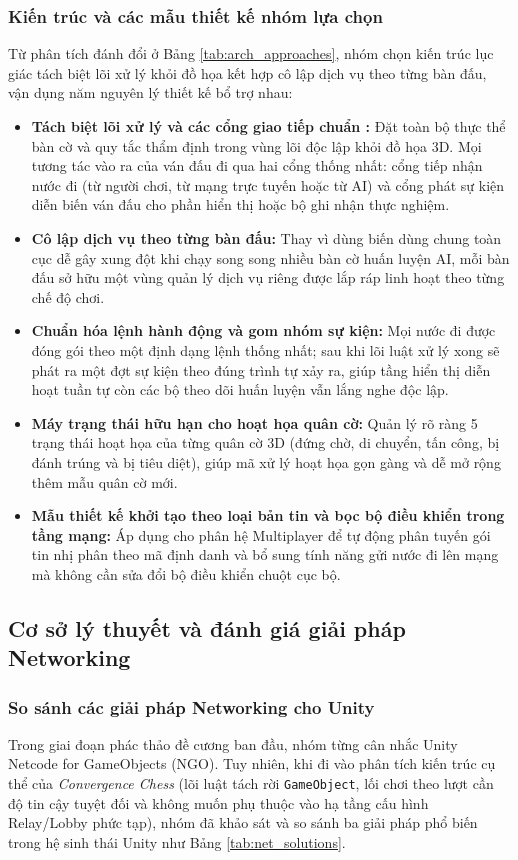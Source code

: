 \subsubsection{Kiến trúc và các mẫu thiết kế nhóm lựa chọn}
Từ phân tích đánh đổi ở Bảng \ref{tab:arch_approaches}, nhóm chọn kiến trúc lục giác tách biệt lõi xử lý khỏi đồ họa \cite{cockburn} kết hợp cô lập dịch vụ theo từng bàn đấu, vận dụng năm nguyên lý thiết kế bổ trợ nhau:
\begin{itemize}
    \item \textbf{Tách biệt lõi xử lý và các cổng giao tiếp chuẩn \cite{cockburn}:} Đặt toàn bộ thực thể bàn cờ và quy tắc thẩm định trong vùng lõi độc lập khỏi đồ họa 3D. Mọi tương tác vào ra của ván đấu đi qua hai cổng thống nhất: cổng tiếp nhận nước đi (từ người chơi, từ mạng trực tuyến hoặc từ AI) và cổng phát sự kiện diễn biến ván đấu cho phần hiển thị hoặc bộ ghi nhận thực nghiệm.
    \item \textbf{Cô lập dịch vụ theo từng bàn đấu:} Thay vì dùng biến dùng chung toàn cục dễ gây xung đột khi chạy song song nhiều bàn cờ huấn luyện AI, mỗi bàn đấu sở hữu một vùng quản lý dịch vụ riêng được lắp ráp linh hoạt theo từng chế độ chơi.
    \item \textbf{Chuẩn hóa lệnh hành động và gom nhóm sự kiện:} Mọi nước đi được đóng gói theo một định dạng lệnh thống nhất; sau khi lõi luật xử lý xong sẽ phát ra một đợt sự kiện theo đúng trình tự xảy ra, giúp tầng hiển thị diễn hoạt tuần tự còn các bộ theo dõi huấn luyện vẫn lắng nghe độc lập.
    \item \textbf{Máy trạng thái hữu hạn cho hoạt họa quân cờ:} Quản lý rõ ràng 5 trạng thái hoạt họa của từng quân cờ 3D (đứng chờ, di chuyển, tấn công, bị đánh trúng và bị tiêu diệt), giúp mã xử lý hoạt họa gọn gàng và dễ mở rộng thêm mẫu quân cờ mới.
    \item \textbf{Mẫu thiết kế khởi tạo theo loại bản tin và bọc bộ điều khiển trong tầng mạng:} Áp dụng cho phân hệ Multiplayer để tự động phân tuyến gói tin nhị phân theo mã định danh và bổ sung tính năng gửi nước đi lên mạng mà không cần sửa đổi bộ điều khiển chuột cục bộ.
\end{itemize}

\subsection{Cơ sở lý thuyết và đánh giá giải pháp Networking}
\subsubsection{So sánh các giải pháp Networking cho Unity}
Trong giai đoạn phác thảo đề cương ban đầu, nhóm từng cân nhắc Unity Netcode for GameObjects (NGO). Tuy nhiên, khi đi vào phân tích kiến trúc cụ thể của \textit{Convergence Chess} (lõi luật tách rời \texttt{GameObject}, lối chơi theo lượt cần độ tin cậy tuyệt đối và không muốn phụ thuộc vào hạ tầng cấu hình Relay/Lobby phức tạp), nhóm đã khảo sát và so sánh ba giải pháp phổ biến trong hệ sinh thái Unity như Bảng \ref{tab:net_solutions}.

